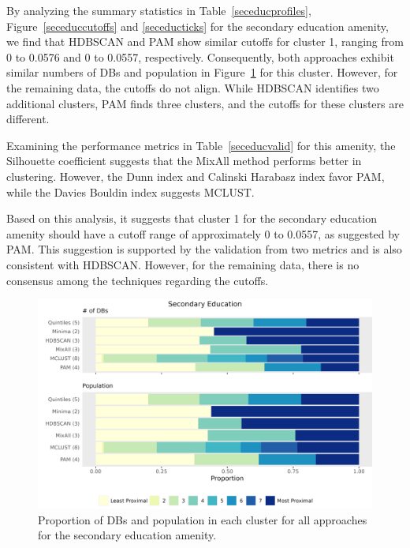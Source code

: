 \documentclass[11pt, a4paper]{article}
\begin{document}
By analyzing the summary statistics in Table~\ref{seceducprofiles}, Figure~\ref{seceduccutoffs} and \ref{seceducticks} for the secondary education amenity, we find that HDBSCAN and PAM show similar cutoffs for cluster 1, ranging from 0 to 0.0576 and 0 to 0.0557, respectively. Consequently, both approaches exhibit similar numbers of DBs and population in Figure~\ref{seceducbarplot} for this cluster. However, for the remaining data, the cutoffs do not align. While HDBSCAN identifies two additional clusters, PAM finds three clusters, and the cutoffs for these clusters are different.
\par
Examining the performance metrics in Table~\ref{seceducvalid} for this amenity, the Silhouette coefficient suggests that the MixAll method performs better in clustering. However, the Dunn index and Calinski Harabasz index favor PAM, while the Davies Bouldin index suggests MCLUST.
\par
Based on this analysis, it suggests that cluster 1 for the secondary education amenity should have a cutoff range of approximately 0 to 0.0557, as suggested by PAM. This suggestion is supported by the validation from two metrics and is also consistent with HDBSCAN. However, for the remaining data, there is no consensus among the techniques regarding the cutoffs.



\begin{figure}[H]
\centering
\includegraphics[width=\textwidth]{./barplot_comparison/Secondary Education_barplot.png}
\caption[Secondary education profile barplot]{Proportion of DBs and population in each cluster for all approaches for the secondary education amenity.}\label{seceducbarplot}
\end{figure}
\end{document}
